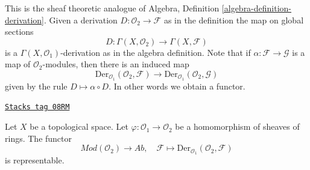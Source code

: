 This is the sheaf theoretic analogue of
Algebra, Definition \ref{algebra-definition-derivation}.
Given a derivation $D : \mathcal{O}_2 \to \mathcal{F}$
as in the definition the map on global sections
$$
D : \Gamma(X, \mathcal{O}_2) \longrightarrow \Gamma(X, \mathcal{F})
$$
is a $\Gamma(X, \mathcal{O}_1)$-derivation as in the algebra definition.
Note that if $\alpha : \mathcal{F} \to \mathcal{G}$ is a map of
$\mathcal{O}_2$-modules, then there is an induced map
$$
\text{Der}_{\mathcal{O}_1}(\mathcal{O}_2, \mathcal{F})
\longrightarrow
\text{Der}_{\mathcal{O}_1}(\mathcal{O}_2, \mathcal{G})
$$
given by the rule $D \mapsto \alpha \circ D$. In other words
we obtain a functor.

\begin{lemma}
\label{modules-lemma-universal-module}
\href{https://stacks.math.columbia.edu/tag/08RM}{\texttt{Stacks tag 08RM}}

Let $X$ be a topological space. Let $\varphi : \mathcal{O}_1 \to \mathcal{O}_2$
be a homomorphism of sheaves of rings. The functor
$$
\textit{Mod}(\mathcal{O}_2) \longrightarrow \textit{Ab}, \quad
\mathcal{F} \longmapsto \text{Der}_{\mathcal{O}_1}(\mathcal{O}_2, \mathcal{F})
$$
is representable.
\end{lemma}

